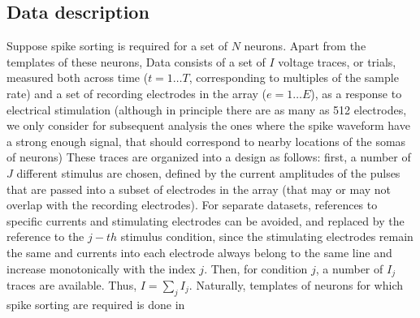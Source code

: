 \documentclass[12pt,letterpaper,fleqn]{article}
\begin{document}
 \subsection{Data description}
Suppose spike sorting is required for a set of $N$ neurons. Apart from the templates of these neurons, Data consists of a set of $I$ voltage traces, or trials, measured both across time ($t=1\ldots T$, corresponding to multiples of the sample rate) and a set of recording electrodes in the array ($e=1\ldots E$), as a response to electrical stimulation (although in principle there are as many as 512 electrodes, we only consider for subsequent analysis the ones where the spike waveform have a strong enough signal, that should correspond to nearby locations of the somas of neurons) These traces are organized into a design as follows: first, a number of $J$ different stimulus are chosen, defined by the current amplitudes of the pulses that are passed into a subset of electrodes in the array (that may or may not overlap with the recording electrodes). For separate datasets, references to specific currents and stimulating electrodes can be avoided, and replaced by the reference to the $j-th$ stimulus condition, since the stimulating electrodes remain the same and currents into each electrode always belong to the same line and increase monotonically with the index $j$. Then, for condition $j$, a number of $I_j$ traces are available. Thus,  $I = \sum_j I_j$. Naturally, templates of neurons for which spike sorting are required is done in 
\end{document}
